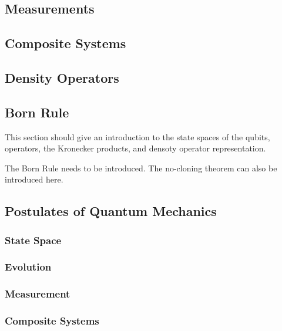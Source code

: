 \documentclass{article}
\begin{document}
\subsection{Measurements}

\subsection{Composite Systems}

\subsection{Density Operators}

\subsection{Born Rule}









This section should give an introduction to the state spaces of the qubits, operators, the Kronecker products, and densoty operator representation. 

The Born Rule needs to be introduced. The no-cloning theorem can also be introduced here.



\subsection{Postulates of Quantum Mechanics}

\subsubsection{State Space}

\subsubsection{Evolution}

\subsubsection{Measurement}

\subsubsection{Composite Systems}
\end{document}
